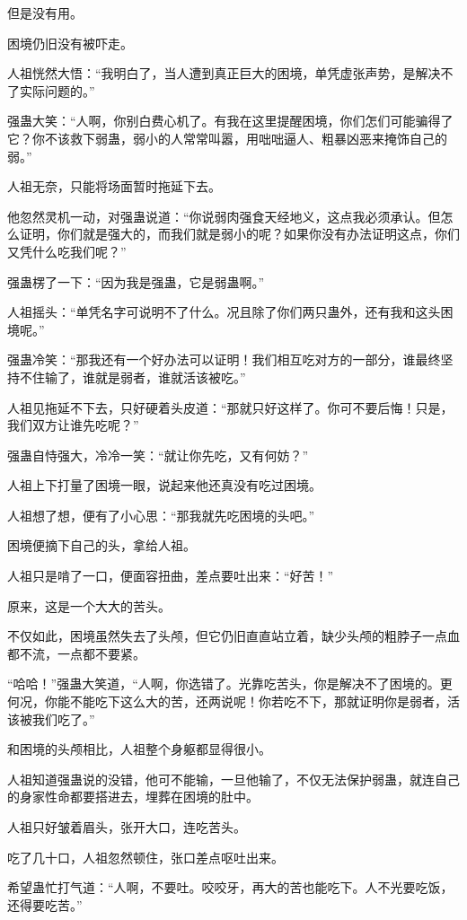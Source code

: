 \begin{this_body}
但是没有用。

困境仍旧没有被吓走。

人祖恍然大悟：“我明白了，当人遭到真正巨大的困境，单凭虚张声势，是解决不了实际问题的。”

强蛊大笑：“人啊，你别白费心机了。有我在这里提醒困境，你们怎们可能骗得了它？你不该救下弱蛊，弱小的人常常叫嚣，用咄咄逼人、粗暴凶恶来掩饰自己的弱。”

人祖无奈，只能将场面暂时拖延下去。

他忽然灵机一动，对强蛊说道：“你说弱肉强食天经地义，这点我必须承认。但怎么证明，你们就是强大的，而我们就是弱小的呢？如果你没有办法证明这点，你们又凭什么吃我们呢？”

强蛊楞了一下：“因为我是强蛊，它是弱蛊啊。”

人祖摇头：“单凭名字可说明不了什么。况且除了你们两只蛊外，还有我和这头困境呢。”

强蛊冷笑：“那我还有一个好办法可以证明！我们相互吃对方的一部分，谁最终坚持不住输了，谁就是弱者，谁就活该被吃。”

人祖见拖延不下去，只好硬着头皮道：“那就只好这样了。你可不要后悔！只是，我们双方让谁先吃呢？”

强蛊自恃强大，冷冷一笑：“就让你先吃，又有何妨？”

人祖上下打量了困境一眼，说起来他还真没有吃过困境。

人祖想了想，便有了小心思：“那我就先吃困境的头吧。”

困境便摘下自己的头，拿给人祖。

人祖只是啃了一口，便面容扭曲，差点要吐出来：“好苦！”

原来，这是一个大大的苦头。

不仅如此，困境虽然失去了头颅，但它仍旧直直站立着，缺少头颅的粗脖子一点血都不流，一点都不要紧。

“哈哈！”强蛊大笑道，“人啊，你选错了。光靠吃苦头，你是解决不了困境的。更何况，你能不能吃下这么大的苦，还两说呢！你若吃不下，那就证明你是弱者，活该被我们吃了。”

和困境的头颅相比，人祖整个身躯都显得很小。

人祖知道强蛊说的没错，他可不能输，一旦他输了，不仅无法保护弱蛊，就连自己的身家性命都要搭进去，埋葬在困境的肚中。

人祖只好皱着眉头，张开大口，连吃苦头。

吃了几十口，人祖忽然顿住，张口差点呕吐出来。

希望蛊忙打气道：“人啊，不要吐。咬咬牙，再大的苦也能吃下。人不光要吃饭，还得要吃苦。”


\end{this_body}
